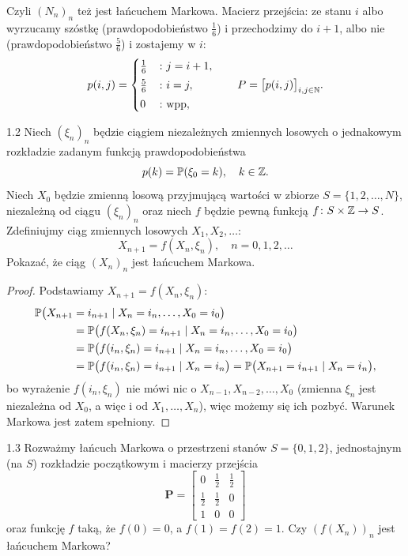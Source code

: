 \documentclass[dvipsnames]{book}
\begin{document}
Czyli $(N_n)_n$ też jest łańcuchem Markowa. Macierz przejścia: ze stanu $i$
albo wyrzucamy szóstkę (prawdopodobieństwo $\tfrac16$) i przechodzimy do $i+1$,
albo nie (prawdopodobieństwo $\tfrac56$) i zostajemy w $i$:
\[
  p(i,j) =
  \begin{cases}
    \tfrac{1}{6} & \colon j = i+1, \\[1mm]
    \tfrac{5}{6} & \colon i = j, \\[1mm]
    0            & \colon \text{wpp},
  \end{cases}
  \qquad
  P = \big[p(i,j)\big]_{i,j \in \N}.
\]

\begin{zadanie}{1.2}
Niech $(\xi_n)_n$ będzie ciągiem niezależnych zmiennych losowych o jednakowym
rozkładzie zadanym funkcją prawdopodobieństwa
\[
  p(k) = \P(\xi_0 = k), \quad k \in \Z.
\]
Niech $X_0$ będzie zmienną losową przyjmującą wartości w zbiorze
$S = \{1, 2, \ldots, N\}$, niezależną od ciągu $(\xi_n)_n$ oraz niech $f$ będzie
pewną funkcją $f \colon S \times \Z \to S$. Zdefiniujmy ciąg zmiennych losowych
$X_1, X_2, \ldots$:
\[
  X_{n+1} = f(X_n, \xi_n), \quad n = 0, 1, 2, \ldots
\]
Pokazać, że ciąg $(X_n)_n$ jest łańcuchem Markowa.
\end{zadanie}

\begin{proof}
Podstawiamy $X_{n+1} = f(X_n, \xi_n)$:
\begin{align*}
  \P\big(X_{n+1} &= i_{n+1} \mid X_n = i_n, \ldots, X_0 = i_0\big) \\
  &= \P\big(f(X_n, \xi_n) = i_{n+1} \mid X_n = i_n, \ldots, X_0 = i_0\big) \\
  &= \P\big(f(i_n, \xi_n) = i_{n+1} \mid X_n = i_n, \ldots, X_0 = i_0\big) \\
  &= \P\big(f(i_n, \xi_n) = i_{n+1} \mid X_n = i_n\big)
   = \P\big(X_{n+1} = i_{n+1} \mid X_n = i_n\big),
\end{align*}
bo wyrażenie $f(i_n, \xi_n)$ nie mówi nic o $X_{n-1}, X_{n-2}, \ldots, X_0$
(zmienna $\xi_n$ jest niezależna od $X_0$, a więc i od $X_1, \ldots, X_n$),
więc możemy się ich pozbyć. Warunek Markowa jest zatem spełniony.
\end{proof}

\begin{zadanie}{1.3}
Rozważmy łańcuch Markowa o przestrzeni stanów $S = \{0,1,2\}$, jednostajnym
(na $S$) rozkładzie początkowym i macierzy przejścia
\[
  \mathbf{P} =
  \begin{bmatrix}
    0           & \tfrac{1}{2} & \tfrac{1}{2} \\[1mm]
    \tfrac{1}{2} & \tfrac{1}{2} & 0 \\[1mm]
    1           & 0            & 0
  \end{bmatrix}
\]
oraz funkcję $f$ taką, że $f(0) = 0$, a $f(1) = f(2) = 1$. Czy $(f(X_n))_n$ jest
łańcuchem Markowa?
\end{zadanie}
\end{document}
